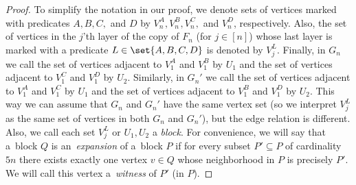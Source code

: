 \begin{proof}
    To simplify the notation in our proof, we denote sets of vertices marked with predicates $A, B, C,$ and $D$ by $V_n^A, V_n^B, V_n^C,$ and $V_n^D$, respectively.
    Also, the set of vertices in the $j$'th layer of the copy of $F_n$ (for $j \in [n]$) whose last layer is marked with a predicate $L \in \set{A, B, C, D}$ is denoted by $V_j^L$.
    Finally, in $G_n$ we call the set of vertices adjacent to $V_1^A$ and $V_1^B$ by $U_1$ and the set of vertices adjacent to $V_1^C$ and $V_1^D$ by $U_2$.
    Similarly, in $G_n'$ we call the set of vertices adjacent to $V_1^A$ and $V_1^C$ by $U_1$ and the set of vertices adjacent to $V_1^B$ and $V_1^D$ by $U_2$.
    This way we can assume that $G_n$ and $G_n'$ have the same vertex set (so we interpret $V_j^L$ as the same set of vertices in both $G_n$ and $G_n'$), but the edge relation is different.
    Also, we call each set $V_j^L$ or $U_1, U_2$ a \emph{block}.
    For convenience, we will say that a~block $Q$ is an~\emph{expansion} of a~block $P$ if for every subset $P' \subseteq P$ of cardinality $5n$ there exists exactly one vertex $v \in Q$ whose neighborhood in $P$ is precisely $P'$.
    We will call this vertex a~\emph{witness} of $P'$ (in $P$).
    


\end{proof}

